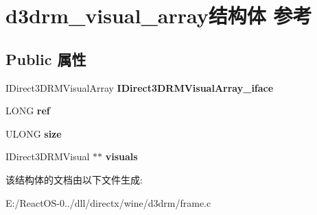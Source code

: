 \hypertarget{structd3drm__visual__array}{}\section{d3drm\+\_\+visual\+\_\+array结构体 参考}
\label{structd3drm__visual__array}
\subsection*{Public 属性}
\begin{DoxyCompactItemize}
\item 
\mbox{\label{structd3drm__visual__array_ac4bfae61fd8cab2ef288aaeaecec47e0}} 
I\+Direct3\+D\+R\+M\+Visual\+Array {\bfseries I\+Direct3\+D\+R\+M\+Visual\+Array\+\_\+iface}
\item 
\mbox{\label{structd3drm__visual__array_ab8344225e3c584551967f733b46cd6e9}} 
L\+O\+NG {\bfseries ref}
\item 
\mbox{\label{structd3drm__visual__array_a2ce559351892a9a8b32d796306f32600}} 
U\+L\+O\+NG {\bfseries size}
\item 
\mbox{\label{structd3drm__visual__array_a5ce98fe80bcff94a27748b6db7235d80}} 
I\+Direct3\+D\+R\+M\+Visual $\ast$$\ast$ {\bfseries visuals}
\end{DoxyCompactItemize}


该结构体的文档由以下文件生成\+:\begin{DoxyCompactItemize}
\item 
E\+:/\+React\+O\+S-\/0../dll/directx/wine/d3drm/frame.\+c\end{DoxyCompactItemize}
